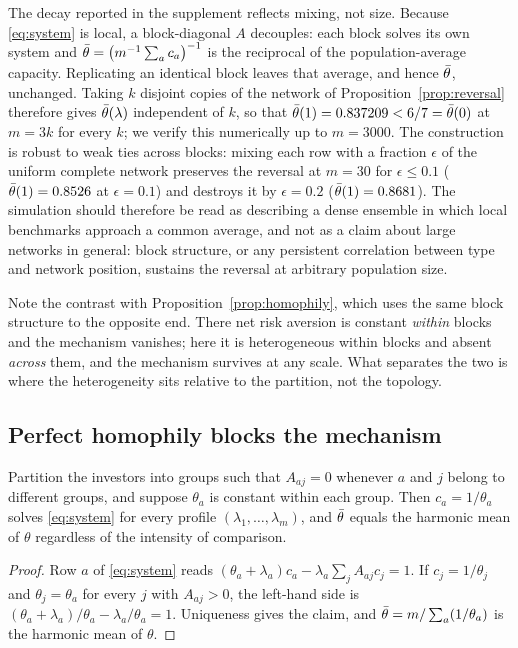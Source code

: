 \begin{remark}
\label{rem:blocks}
The decay reported in the supplement reflects mixing, not size. Because
\eqref{eq:system} is local, a block-diagonal $A$ decouples: each block solves
its own system and $\bar\theta=\big(m^{-1}\sum_ac_a\big)^{-1}$ is the reciprocal of
the population-average capacity. Replicating an identical block leaves that
average, and hence $\bar\theta$, unchanged. Taking $k$ disjoint copies of the network
of Proposition~\ref{prop:reversal} therefore gives $\bar\theta(\lambda)$ independent
of $k$, so that $\bar\theta(1)=0.837209<6/7=\bar\theta(0)$ at $m=3k$ for every $k$; we verify
this numerically up to $m=3000$. The construction is robust to weak ties across
blocks: mixing each row with a fraction $\epsilon$ of the uniform complete
network preserves the reversal at $m=30$ for $\epsilon\leq0.1$
($\bar\theta(1)=0.8526$ at $\epsilon=0.1$) and destroys it by $\epsilon=0.2$
($\bar\theta(1)=0.8681$). The simulation should therefore be read as describing a
dense ensemble in which local benchmarks approach a common average, and not as
a claim about large networks in general: block structure, or any persistent
correlation between type and network position, sustains the reversal at
arbitrary population size.

Note the contrast with Proposition~\ref{prop:homophily}, which uses the same
block structure to the opposite end. There net risk aversion is constant
\emph{within} blocks and the mechanism vanishes; here it is heterogeneous
within blocks and absent \emph{across} them, and the mechanism survives at any
scale. What separates the two is where the heterogeneity sits relative to the
partition, not the topology.
\end{remark}

\subsection{Perfect homophily blocks the mechanism}

\begin{proposition}
\label{prop:homophily}
Partition the investors into groups such that $A_{aj}=0$ whenever $a$ and $j$
belong to different groups, and suppose $\theta_a$ is constant within each
group. Then $c_a=1/\theta_a$ solves \eqref{eq:system} for every profile
$(\lambda_1,\dots,\lambda_m)$, and $\bar\theta$ equals the harmonic mean of $\theta$
regardless of the intensity of comparison.
\end{proposition}

\begin{proof}
Row $a$ of \eqref{eq:system} reads
$(\theta_a+\lambda_a)c_a-\lambda_a\sum_jA_{aj}c_j=1$. If $c_j=1/\theta_j$ and
$\theta_j=\theta_a$ for every $j$ with $A_{aj}>0$, the left-hand side is
$(\theta_a+\lambda_a)/\theta_a-\lambda_a/\theta_a=1$. Uniqueness gives the
claim, and $\bar\theta=m/\sum_a(1/\theta_a)$ is the harmonic mean of $\theta$.
\end{proof}

